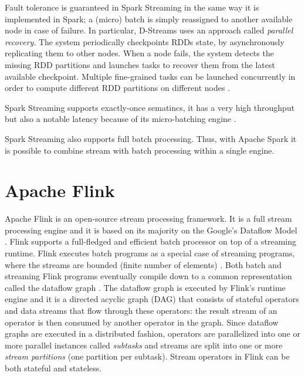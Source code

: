 Fault tolerance is guaranteed in Spark Streaming in the same way it is implemented in Spark; a (micro) batch is simply reassigned to another available node in case of failure. In particular, D-Streams uses an approach called \emph{parallel recovery}. The system periodically checkpoints RDDs state, by asynchronously replicating them to other nodes. When a node fails, the system detects the missing RDD partitions and launches tasks to recover them from the latest available checkpoint. Multiple fine-grained tasks can be launched concurrently in order to compute different RDD partitions on different nodes \cite{apachesparkstreaming}. 

Spark Streaming supports exactly-once sematincs, it has a very high throughput but also a notable latency because of its micro-batching engine \cite{streamprocessingcomparison, yahoobenchmarkingonline, zalandobenchmarkingonline}. 

Spark Streaming also supports full batch processing. Thus, with Apache Spark it is possible to combine stream with batch processing within a single engine.
\section{Apache Flink}
Apache Flink \cite{apacheflinkonline} is an open-source stream processing framework. It is a full stream processing engine and it is based  on its majority on the Google’s Dataflow Model \cite{googledataflow}. Flink supports a full-fledged and efficient batch processor on top of a streaming runtime. Flink executes batch programs as a special case of streaming programs, where the streams are bounded (finite number of elements) \cite{apacheflinkstreamandbatch, apacheflinkstatemanagement}. Both batch and streaming Flink programs eventually compile down to a common representation called the dataflow graph \cite{apacheflinkstreamandbatch, apacheflinkstatemanagement}. The dataflow graph is executed by Flink's runtime engine and it is a directed acyclic graph (DAG) that consists of stateful operators and data streams that flow through these operators: the result stream of an operator is then consumed by another operator in the graph. Since dataflow graphs are executed in a distributed fashion, operators are parallelized into one or more parallel instances called \emph{subtasks} and streams are split into one or more \emph{stream partitions} (one partition per subtask). Stream operators in Flink can be both stateful and stateless. 

